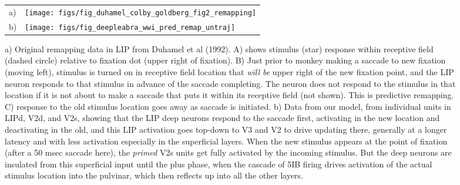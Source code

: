 \documentclass[11pt,twoside]{article}
\newif\myifpdf
\begin{document}
\begin{figure}
  \begin{center}
    \begin{tabular}{ll}
      \parbox[b]{.1em}{a) \vspace*{1.4in}} &
      \texttt{[image: figs/fig\_duhamel\_colby\_goldberg\_fig2\_remapping]} \\
      \parbox[b]{.1em}{b) \vspace*{1.4in}} &
      \texttt{[image: figs/fig\_deepleabra\_wwi\_pred\_remap\_untraj]}
    \end{tabular}
  \end{center}
  \caption{\footnotesize a) Original remapping data in LIP from Duhamel et al (1992).  A) shows stimulus (star) response within receptive field (dashed circle) relative to fixation dot (upper right of fixation).  B) Just prior to monkey making a saccade to new fixation (moving left), stimulus is turned on in receptive field location that {\em will be} upper right of the new fixation point, and the LIP neuron responds to that stimulus in advance of the saccade completing.  The neuron does not respond to the stimulus in that location if it is not about to make a saccade that puts it within its receptive field (not shown).  This is predictive remapping.  C) response to the old stimulus location goes away as saccade is initiated.  b) Data from our model, from individual units in LIPd, V2d, and V2s, showing that the LIP deep neurons respond to the saccade first, activating in the new location and deactivating in the old, and this LIP activation goes top-down to V3 and V2 to drive updating there, generally at a longer latency and with less activation especially in the superficial layers.  When the new stimulus appears at the point of fixation (after a 50 msec saccade here), the {\em primed} V2s units get fully activated by the incoming stimulus.  But the deep neurons are insulated from this superficial input until the plus phase, when the cascade of 5IB firing drives activation of the actual stimulus location into the pulvinar, which then reflects up into all the other layers.}
  \label{fig.remap_units}
\end{figure}
\end{document}
